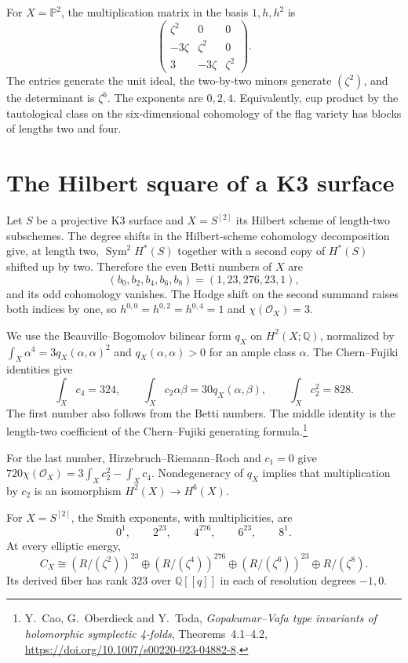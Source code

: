 For $X=\mathbb P^2$, the multiplication matrix in the basis $1,h,h^2$
is
\[
 \begin{pmatrix}
 \zeta^2&0&0\\-3\zeta&\zeta^2&0\\3&-3\zeta&\zeta^2
 \end{pmatrix}.
\]
The entries generate the unit ideal, the two-by-two minors generate
$(\zeta^2)$, and the determinant is $\zeta^6$. The exponents are
$0,2,4$. Equivalently, cup product by the tautological class on the
six-dimensional cohomology of the flag variety has blocks of lengths
two and four.

\section{The Hilbert square of a K3 surface}
\label{ed:sec:square}

Let $S$ be a projective K3 surface and $X=S^{[2]}$ its Hilbert scheme
of length-two subschemes. The degree shifts in the Hilbert-scheme
cohomology decomposition\cite{NakajimaHilbert1997} give, at length
two, $\operatorname{Sym}^2H^*(S)$ together with a second copy of
$H^*(S)$ shifted up by two. Therefore the even Betti numbers of $X$ are
\[
 (b_0,b_2,b_4,b_6,b_8)=(1,23,276,23,1),
\]
and its odd cohomology vanishes. The Hodge shift on the second summand
raises both indices by one, so
$h^{0,0}=h^{0,2}=h^{0,4}=1$ and $\chi(\mathcal O_X)=3$.

We use the Beauville--Bogomolov bilinear form $q_X$ on $H^2(X;\mathbb Q)$,
normalized by $\int_X\alpha^4=3q_X(\alpha,\alpha)^2$ and
$q_X(\alpha,\alpha)>0$ for an ample class $\alpha$.
The Chern--Fujiki identities give
\begin{equation}\label{ed:eq:chern-square}
 \int_Xc_4=324,\qquad
 \int_Xc_2\alpha\beta=30q_X(\alpha,\beta),\qquad
 \int_Xc_2^2=828.
\end{equation}
The first number also follows from the Betti numbers. The middle
identity is the length-two coefficient of the Chern--Fujiki generating
formula.\footnote{Y.~Cao, G.~Oberdieck and Y.~Toda,
\emph{Gopakumar--Vafa type invariants of holomorphic symplectic
4-folds}, Theorems~4.1--4.2,
\url{https://doi.org/10.1007/s00220-023-04882-8}.}

For the last number, Hirzebruch--Riemann--Roch and $c_1=0$ give
$720\chi(\mathcal O_X)=3\int_Xc_2^2-\int_Xc_4$.
Nondegeneracy of $q_X$ implies that multiplication by $c_2$ is an
isomorphism $H^2(X)\to H^6(X)$.

\begin{theorem}\label{ed:thm:square}
For $X=S^{[2]}$, the Smith exponents, with multiplicities, are
\begin{equation}\label{ed:eq:square-spectrum}
 0^1,\qquad 2^{23},\qquad 4^{276},\qquad 6^{23},\qquad 8^1.
\end{equation}
At every elliptic energy,
\[
 C_X\cong
 (R/(\zeta^2))^{23}\oplus(R/(\zeta^4))^{276}
 \oplus(R/(\zeta^6))^{23}\oplus R/(\zeta^8).
\]
Its derived fiber has rank $323$ over $\mathbb Q[[q]]$ in each of
resolution degrees $-1,0$.
\end{theorem}

